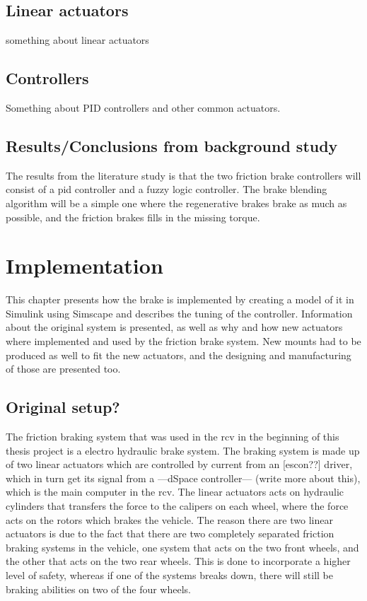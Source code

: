\documentclass[a4paper,11pt]{kth-mag}
\begin{document}
\section{Linear actuators}
something about linear actuators
\section{Controllers}
Something about PID controllers and other common actuators.
\section{Results/Conclusions from background study}
The results from the literature study is that the two friction brake controllers will consist of a \gls{pid} controller and a fuzzy logic controller. 
The brake blending algorithm will be a simple one where the regenerative brakes brake as much as possible, and the friction brakes fills in the missing torque. 



\chapter{Implementation}

This chapter presents how the brake is implemented by creating a model of it in Simulink using Simscape and describes the tuning of the controller. Information about the original system is presented, as well as why and how new actuators where implemented and used by the friction brake system. New mounts had to be produced as well to fit the new actuators, and the designing and manufacturing of those are presented too. 

\section{Original setup?}
The friction braking system that was used in the \gls{rcv} in the beginning of this thesis project is a electro hydraulic brake system. The braking system is made up of two linear actuators which are controlled by current from an [escon??] driver, which in turn get its signal from a ---dSpace controller--- (write more about this), which is the main computer in the \gls{rcv}. The linear actuators acts on hydraulic cylinders that transfers the force to the calipers on each wheel, where the force acts on the rotors which brakes the vehicle. The reason there are two linear actuators is due to the fact that there are two completely separated friction braking systems in the vehicle, one system that acts on the two front wheels, and the other that acts on the two rear wheels. This is done to incorporate a higher level of safety, whereas if one of the systems breaks down, there will still be braking abilities on two of the four wheels. \newline
\end{document}
